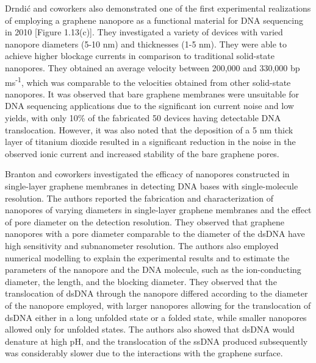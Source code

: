 Drndi\'{c} and coworkers also demonstrated one of the first experimental realizations of employing a graphene nanopore as a functional material for DNA sequencing in 2010 [Figure 1.13(c)]. They investigated a variety of devices with varied nanopore diameters (5-10 nm) and thicknesses (1-5 nm).\supercite{merchant_dna_2010} They were able to achieve higher blockage currents in comparison to traditional solid-state nanopores. They obtained an average velocity between 200,000 and 330,000 bp ms\textsuperscript{-1}, which was comparable to the velocities obtained from other solid-state nanopores. It was observed that bare graphene membranes were unsuitable for DNA sequencing applications due to the significant ion current noise and low yields, with only 10\% of the fabricated 50 devices having detectable DNA translocation. However, it was also noted that the deposition of a 5 nm thick layer of titanium dioxide resulted in a significant reduction in the noise in the observed ionic current and increased stability of the bare graphene pores.

Branton and coworkers investigated the efficacy of nanopores constructed in single-layer graphene membranes in detecting DNA bases with single-molecule resolution\supercite{garaj_molecule-hugging_2013}. The authors reported the fabrication and characterization of nanopores of varying diameters in single-layer graphene membranes and the effect of pore diameter on the detection resolution. They observed that graphene nanopores with a pore diameter comparable to the diameter of the dsDNA have high sensitivity and subnanometer resolution. The authors also employed numerical modelling to explain the experimental results and to estimate the parameters of the nanopore and the DNA molecule, such as the ion-conducting diameter, the length, and the blocking diameter. They observed that the translocation of dsDNA through the nanopore differed according to the diameter of the nanopore employed, with larger nanopores allowing for the translocation of dsDNA either in a long unfolded state or a folded state, while smaller nanopores allowed only for unfolded states. The authors also showed that dsDNA would denature at high pH, and the translocation of the ssDNA produced subsequently was considerably slower due to the interactions with the graphene surface. 

